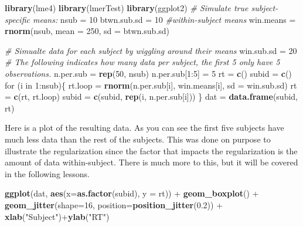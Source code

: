 \documentclass[]{book}
\newenvironment{Shaded}{\begin{snugshade}}{\end{snugshade}}
\newcommand{\KeywordTok}[1]{\textcolor[rgb]{0.13,0.29,0.53}{\textbf{{#1}}}}
\newcommand{\DataTypeTok}[1]{\textcolor[rgb]{0.13,0.29,0.53}{{#1}}}
\newcommand{\DecValTok}[1]{\textcolor[rgb]{0.00,0.00,0.81}{{#1}}}
\newcommand{\FloatTok}[1]{\textcolor[rgb]{0.00,0.00,0.81}{{#1}}}
\newcommand{\StringTok}[1]{\textcolor[rgb]{0.31,0.60,0.02}{{#1}}}
\newcommand{\CommentTok}[1]{\textcolor[rgb]{0.56,0.35,0.01}{\textit{{#1}}}}
\newcommand{\NormalTok}[1]{{#1}}
\begin{document}
\begin{Shaded}
\begin{Highlighting}[]
\KeywordTok{library}\NormalTok{(lme4)}
\KeywordTok{library}\NormalTok{(lmerTest)}
\KeywordTok{library}\NormalTok{(ggplot2)}
\CommentTok{# Simulate true subject-specific means:}
\NormalTok{nsub =}\StringTok{ }\DecValTok{10}
\NormalTok{btwn.sub.sd =}\StringTok{ }\DecValTok{10}
\CommentTok{#within-subject means }
\NormalTok{win.means =}\StringTok{ }\KeywordTok{rnorm}\NormalTok{(nsub, }\DataTypeTok{mean =} \DecValTok{250}\NormalTok{, }\DataTypeTok{sd =} \NormalTok{btwn.sub.sd)}

\CommentTok{# Simualte data for each subject by wiggling around their means}
\NormalTok{win.sub.sd =}\StringTok{ }\DecValTok{20}
\CommentTok{# The following indicates how many data per subject, the first 5 only have 5 observations.}
\NormalTok{n.per.sub =}\StringTok{ }\KeywordTok{rep}\NormalTok{(}\DecValTok{50}\NormalTok{, nsub)}
\NormalTok{n.per.sub[}\DecValTok{1}\NormalTok{:}\DecValTok{5}\NormalTok{] =}\StringTok{ }\DecValTok{5}
\NormalTok{rt =}\StringTok{ }\KeywordTok{c}\NormalTok{()}
\NormalTok{subid =}\StringTok{ }\KeywordTok{c}\NormalTok{()}
\NormalTok{for (i in }\DecValTok{1}\NormalTok{:nsub)\{}
  \NormalTok{rt.loop =}\StringTok{ }\KeywordTok{rnorm}\NormalTok{(n.per.sub[i], win.means[i], }\DataTypeTok{sd =} \NormalTok{win.sub.sd)}
  \NormalTok{rt =}\StringTok{ }\KeywordTok{c}\NormalTok{(rt, rt.loop)}
  \NormalTok{subid =}\StringTok{ }\KeywordTok{c}\NormalTok{(subid, }\KeywordTok{rep}\NormalTok{(i, n.per.sub[i]))}
\NormalTok{\}}
\NormalTok{dat =}\StringTok{ }\KeywordTok{data.frame}\NormalTok{(subid, rt)}
\end{Highlighting}
\end{Shaded}

Here is a plot of the resulting data. As you can see the first five
subjects have much less data than the rest of the subjects. This was
done on purpose to illustrate the regularization since the factor that
impacts the regularization is the amount of data within-subject. There
is much more to this, but it will be covered in the following lessons.

\begin{Shaded}
\begin{Highlighting}[]
\KeywordTok{ggplot}\NormalTok{(dat, }\KeywordTok{aes}\NormalTok{(}\DataTypeTok{x=}\KeywordTok{as.factor}\NormalTok{(subid), }\DataTypeTok{y =} \NormalTok{rt)) +}\StringTok{ }\KeywordTok{geom_boxplot}\NormalTok{() +}\StringTok{ }\KeywordTok{geom_jitter}\NormalTok{(}\DataTypeTok{shape=}\DecValTok{16}\NormalTok{, }\DataTypeTok{position=}\KeywordTok{position_jitter}\NormalTok{(}\FloatTok{0.2}\NormalTok{)) +}\StringTok{ }\KeywordTok{xlab}\NormalTok{(}\StringTok{"Subject"}\NormalTok{)+}\KeywordTok{ylab}\NormalTok{(}\StringTok{"RT"}\NormalTok{)}
\end{Highlighting}
\end{Shaded}
\end{document}
